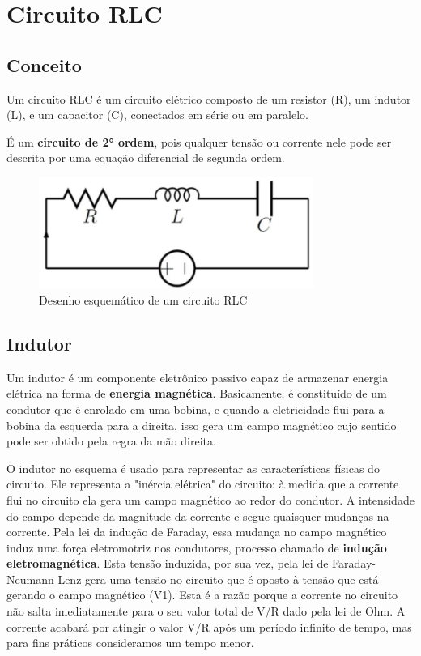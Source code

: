 \section{Circuito RLC}

\subsection{Conceito}

Um circuito RLC é um circuito elétrico composto de um resistor (R), um indutor (L), e um capacitor (C), conectados em série ou em paralelo.

É um \textbf{circuito de 2° ordem}, pois qualquer tensão ou corrente nele pode ser descrita por uma equação diferencial de segunda ordem.

\begin{figure}[H]
	\centering
	\includegraphics[width=0.8\textwidth]{./Imagens/RLC/rlc1.png} 
	\caption{Desenho esquemático de um circuito RLC}
	\label{fig:RLC1}
\end{figure}

\subsection{Indutor}

Um indutor é um componente eletrônico passivo capaz de armazenar energia elétrica na forma de \textbf{energia magnética}. Basicamente, é constituído de um condutor que é enrolado em uma bobina, e quando a eletricidade flui para a bobina da esquerda para a direita, isso gera um campo magnético cujo sentido pode ser obtido pela regra da mão direita.

O indutor no esquema é usado para representar as características físicas do circuito. Ele representa a "inércia elétrica" do circuito: à medida que a corrente flui no circuito ela gera um campo magnético ao redor do condutor. A intensidade do campo depende da magnitude da corrente e segue quaisquer mudanças na corrente. Pela lei da indução de Faraday, essa mudança no campo magnético induz uma força eletromotriz nos condutores, processo chamado de \textbf{indução eletromagnética}. Esta tensão induzida, por sua vez, pela lei de Faraday-Neumann-Lenz gera uma tensão no circuito que é oposto à tensão que está gerando o campo magnético (V1). Esta é a razão porque a corrente no circuito não salta imediatamente para o seu valor total de V/R dado pela lei de Ohm. A corrente acabará por atingir o valor V/R após um período infinito de tempo, mas para fins práticos consideramos um tempo menor.

